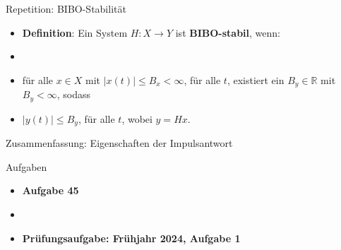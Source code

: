 \documentclass[14pt, aspectratio=169, handout]{beamer}
\begin{document}
\begin{frame}{Repetition: BIBO-Stabilität}
    \begin{itemize}
        \item \textbf{Definition}: Ein System $H:X\to Y$ ist \textbf{BIBO-stabil}, wenn: 
        \item[] 
        \item[] für alle $x\in X$ mit $|x(t)| \leq B_x < \infty$, für alle $t$, existiert ein $B_y \in \mathbb{R}$ mit $B_y < \infty$, sodass 
        \item[] \vspace{0.25cm} $|y(t)| \leq B_y$, für alle $t$, wobei $y=Hx$.
    \end{itemize}
\end{frame}

\begin{frame}{Zusammenfassung: Eigenschaften der Impulsantwort}
\end{frame}

\begin{frame}{Aufgaben}
    \begin{itemize}
        \item \textbf{Aufgabe 45}
        \item[]
        \item \textbf{Prüfungsaufgabe: Frühjahr 2024, Aufgabe 1}
    \end{itemize}
\end{frame}
\end{document}
